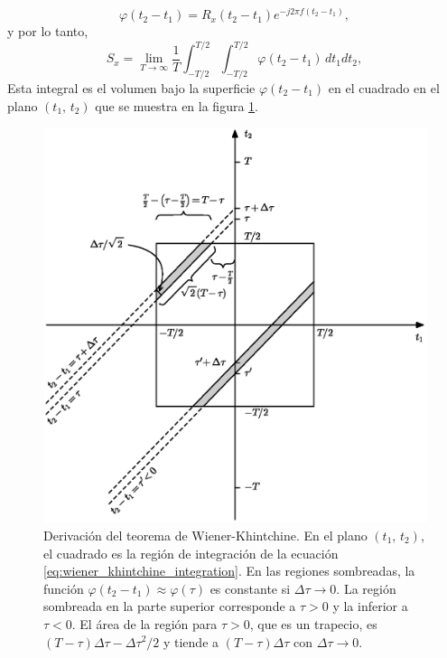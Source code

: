 \documentclass[a4paper]{article}
\begin{document}
\begin{equation}\label{eq:wiener_khintchine_phi_def}
 \varphi(t_2-t_1)=R_x(t_2-t_1)e^{-j2\pi f(t_2-t_1)},
\end{equation}
y por lo tanto,
\begin{equation}\label{eq:wiener_khintchine_integration}
 S_x=\lim_{T\to\infty}\frac{1}{T}\int_{-T/2}^{T/2}\int_{-T/2}^{T/2}\varphi(t_2-t_1)\,dt_1dt_2,
\end{equation}
Esta integral es el volumen bajo la superficie \(\varphi(t_2-t_1)\) en el cuadrado en el plano \((t_1,\, t_2)\) que se muestra en la figura \ref{fig:wiener_khintchine_integration}.

\begin{figure}[!htb]
\begin{center}
\includegraphics[width=0.9\columnwidth]{figuras/wiener_khintchine_integration_v2.eps}
\caption{\label{fig:wiener_khintchine_integration} Derivación del teorema de Wiener-Khintchine. En el plano \((t_1,\,t_2)\), el cuadrado es la región de integración de la ecuación \ref{eq:wiener_khintchine_integration}. En las regiones sombreadas, la función \(\varphi(t_2-t_1)\approx\varphi(\tau)\) es constante si \(\Delta\tau\to0\). La región sombreada en la parte superior corresponde a \(\tau>0\) y la inferior a \(\tau<0\). El área de la región para \(\tau>0\), que es un trapecio, es \((T-\tau)\Delta\tau-\Delta\tau^2/2\) y tiende a \((T-\tau)\Delta\tau\) con \(\Delta\tau\to0\).}
\end{center}
\end{figure}
\end{document}
